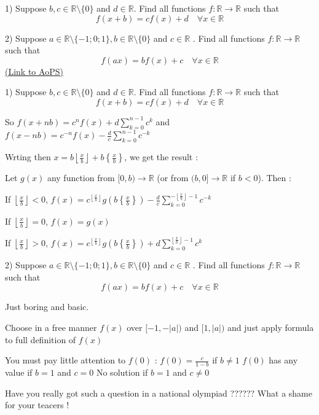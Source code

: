 \begin{problem}
	1) Suppose $b,c\in \mathbb{R}\setminus \{0\}$ and $d\in\mathbb{R}$. Find all functions $f:\mathbb{R}\to\mathbb{R}$ such that
\[f(x+b)=cf(x)+d  \quad \forall x\in\mathbb{R}\]

2) Suppose $a\in\mathbb{R}\setminus \{-1;0;1\} , b\in \mathbb{R}\setminus \{0\}$ and $c\in\mathbb{R}$ . Find all functions $f:\mathbb{R}\to\mathbb{R}$ such that
\[f(ax)=bf(x)+c  \quad \forall x\in\mathbb{R}\]
	\flushright \href{https://artofproblemsolving.com/community/c6h563895}{(Link to AoPS)}
\end{problem}



\begin{solution}
	\begin{tcolorbox}1) Suppose $b,c\in \mathbb{R}\setminus \{0\}$ and $d\in\mathbb{R}$. Find all functions $f:\mathbb{R}\to\mathbb{R}$ such that
\[f(x+b)=cf(x)+d  \quad \forall x\in\mathbb{R}\]\end{tcolorbox}
So $f(x+nb)=c^nf(x)+d\sum_{k=0}^{n-1}c^k$ and $f(x-nb)=c^{-n}f(x)-\frac dc\sum_{k=0}^{n-1}c^{-k}$

Wrting then $x=b\left\lfloor\frac xb\right\rfloor+b\left\{\frac xb\right\}$, we get the result :

Let $g(x)$ any function from $[0,b)\to\mathbb R$ (or from $(b,0]\to\mathbb R$ if $b<0$). Then :

If $\left\lfloor\frac xb\right\rfloor<0$, $f(x)=c^{\left\lfloor\frac xb\right\rfloor}g(b\left\{\frac xb\right\})-\frac dc\sum_{k=0}^{-\left\lfloor\frac xb\right\rfloor-1}c^{-k}$

If $\left\lfloor\frac xb\right\rfloor=0$, $f(x)=g(x)$

If $\left\lfloor\frac xb\right\rfloor>0$, $f(x)=c^{\left\lfloor\frac xb\right\rfloor}g(b\left\{\frac xb\right\})+d\sum_{k=0}^{\left\lfloor\frac xb\right\rfloor-1}c^k$
\end{solution}



\begin{solution}
	\begin{tcolorbox}2) Suppose $a\in\mathbb{R}\setminus \{-1;0;1\} , b\in \mathbb{R}\setminus \{0\}$ and $c\in\mathbb{R}$ . Find all functions $f:\mathbb{R}\to\mathbb{R}$ such that
\[f(ax)=bf(x)+c  \quad \forall x\in\mathbb{R}\]\end{tcolorbox}
Just boring and basic.

Choose in a free manner $f(x)$ over $[-1,-|a|)$ and $[1,|a|)$ and just apply formula to full definition of $f(x)$

You must pay little attention to $f(0)$ :
$f(0)=\frac c{1-b}$ if $b\ne 1$
$f(0)$ has any value if $b=1$ and $c=0$
No solution if $b=1$ and $c\ne 0$

Have you really got such a question in a national olympiad ?????? What a shame for your teacers !
\end{solution}



